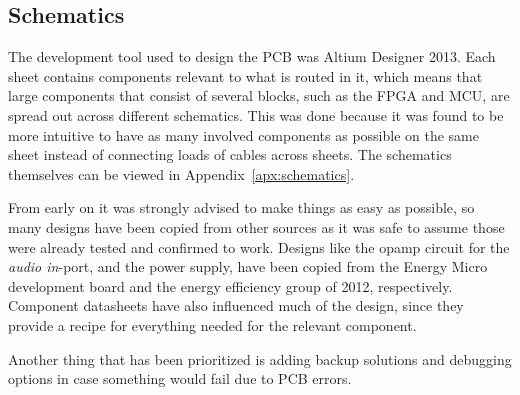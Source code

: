 
\subsection{Schematics}

The development tool used to design the PCB was Altium Designer 2013. Each sheet
contains components relevant to what is routed in it, which means that large
components that consist of several blocks, such as the FPGA and MCU, are spread
out across different schematics. This was done because it was found to be more
intuitive to have as many involved components as possible on the same sheet
instead of connecting loads of cables across sheets. The schematics themselves
can be viewed in Appendix~\ref{apx:schematics}.

From early on it was strongly advised to make things as easy as possible, so
many designs have been copied from other sources as it was safe to assume those
were already tested and confirmed to work. Designs like the opamp circuit for
the \emph{audio in}-port, and the power supply, have been copied from the Energy
Micro development board and the energy efficiency group of 2012, respectively.
Component datasheets have also influenced much of the design, since they provide
a recipe for everything needed for the relevant component.

Another thing that has been prioritized is adding backup solutions and debugging
options in case something would fail due to PCB errors. 

